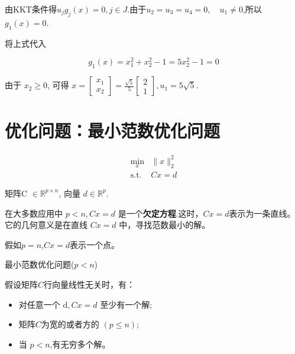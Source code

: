 由KKT条件得$ u_{j} g_{j}(x)=0, j \in J $.由于$ u_{2}=u_{3}=u_{4}=0, \quad u_{1} \neq 0 $,所以$g_1(x) = 0$.


将上式代入

\begin{equation}g_{1}(x)=x_{1}^{2}+x_{2}^{2}-1=5 x_{2}^{2}-1=0\end{equation}


由于 $ x_{2} \geq 0 $, 可得 $x = \left[\begin{array}{l}x_{1} \\ x_{2}\end{array}\right]=\frac{\sqrt{5}}{5}\left[\begin{array}{l}2 \\ 1\end{array}\right], u_{1}=5 \sqrt{5} $.

\section{优化问题：最小范数优化问题}

\begin{problem}

\begin{equation}\begin{aligned}
    \min _{x} &\|x\|_{2}^{2}\\
   \text{s.t.} &C x=d 
\end{aligned}\end{equation}

矩阵C $ \in \mathbb{R}^{p \times n} $, 向量 $ d \in \mathbb{R}^{p} $.
\end{problem}


在大多数应用中 $ p<n,  C x=d $ 是一个\textbf{欠定方程}.这时，$C x=d$表示为一条直线。它的几何意义是在直线 $ C x=d $ 中，寻找范数最小的解。

假如$p = n$,$C x=d$表示一个点。

\begin{FigureCenter}{最小范数优化问题($p < n$)}
    
\end{FigureCenter}



假设矩阵$C$行向量线性无关时，有：
\begin{itemize}
    \item 对任意一个 $ \mathrm{d}, C x=d $ 至少有一个解;
    \item 矩阵$C$为宽的或者方的 $ (p \leq n) $;
    \item 当 $ p<n $,有无穷多个解。
\end{itemize}

